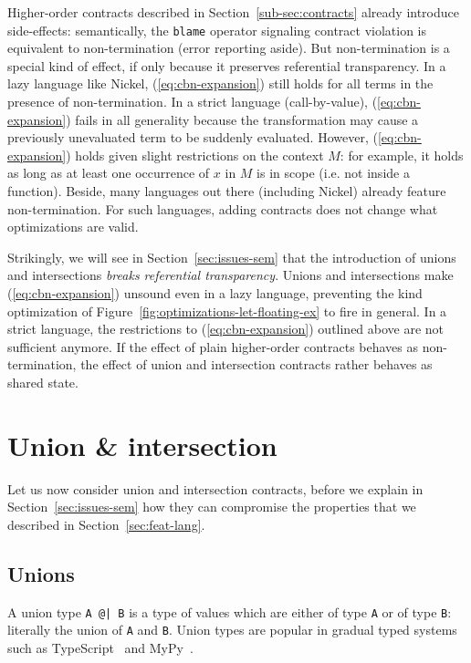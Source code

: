 \documentclass[sigplan,10pt,review,anonymous]{acmart}
\newcommand{\nickel}[1]{\lstinline[language=nickel]{#1}}
\begin{document}
Higher-order contracts described in Section~\ref{sub-sec:contracts} already
introduce side-effects: semantically, the \nickel{blame} operator signaling
contract violation is equivalent to non-termination (error reporting aside).
But non-termination is a special kind of effect, if only because it preserves
referential transparency. In a lazy language like Nickel,
(\ref{eq:cbn-expansion}) still holds for all terms in the presence of
non-termination. In a strict language (call-by-value), (\ref{eq:cbn-expansion})
fails in all generality because the transformation may cause a previously
unevaluated term to be suddenly evaluated.  However, (\ref{eq:cbn-expansion})
holds given slight restrictions on the context $M$: for example, it holds as
long as at least one occurrence of $x$ in $M$ is in scope (i.e. not inside a
function). Beside, many languages out there (including Nickel) already feature
non-termination. For such languages, adding contracts does not change what
optimizations are valid.

Strikingly, we will see in Section~\ref{sec:issues-sem} that the introduction of
unions and intersections \emph{breaks referential transparency}. Unions and
intersections make (\ref{eq:cbn-expansion}) unsound even in a lazy language,
preventing the kind optimization of
Figure~\ref{fig:optimizations-let-floating-ex} to fire in general. In a strict
language, the restrictions to (\ref{eq:cbn-expansion}) outlined above are not
sufficient anymore. If the effect of plain higher-order contracts behaves as
non-termination, the effect of union and intersection contracts rather behaves
as shared state.

\section{Union \& intersection}
\label{sec:union-inter}

Let us now consider union and intersection contracts, before we explain in
Section~\ref{sec:issues-sem} how they can compromise the properties that we
described in Section~\ref{sec:feat-lang}.

\subsection{Unions}

A union type \nickel{A @| B} is a type of values which are either of
type \nickel{A} or of type \nickel{B}: literally the union of
\nickel{A} and \nickel{B}. Union types are popular in gradual typed
systems such as TypeScript~\cite{TypeScriptUnions} and
MyPy~\cite{MyPyOptional}.
\end{document}
